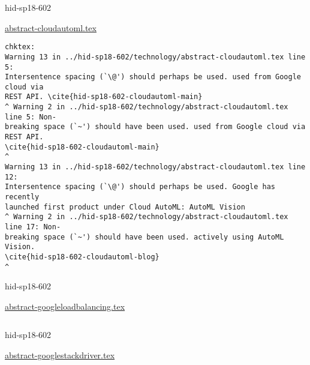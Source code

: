 

\begin{IU}

hid-sp18-602

\href{https://github.com/cloudmesh-community/hid-sp18-602/blob/master//technology/abstract-cloudautoml.tex}{abstract-cloudautoml.tex}

\begin{tiny}
\begin{verbatim}
chktex:
Warning 13 in ../hid-sp18-602/technology/abstract-cloudautoml.tex line 5:
Intersentence spacing (`\@') should perhaps be used. used from Google cloud via
REST API. \cite{hid-sp18-602-cloudautoml-main}
^ Warning 2 in ../hid-sp18-602/technology/abstract-cloudautoml.tex line 5: Non-
breaking space (`~') should have been used. used from Google cloud via REST API.
\cite{hid-sp18-602-cloudautoml-main}                                        ^
Warning 13 in ../hid-sp18-602/technology/abstract-cloudautoml.tex line 12:
Intersentence spacing (`\@') should perhaps be used. Google has recently
launched first product under Cloud AutoML: AutoML Vision
^ Warning 2 in ../hid-sp18-602/technology/abstract-cloudautoml.tex line 17: Non-
breaking space (`~') should have been used. actively using AutoML Vision.
\cite{hid-sp18-602-cloudautoml-blog}                                  ^
\end{verbatim}
\end{tiny}
\end{IU}



\begin{IU}

hid-sp18-602

\href{https://github.com/cloudmesh-community/hid-sp18-602/blob/master//technology/abstract-googleloadbalancing.tex}{abstract-googleloadbalancing.tex}

\begin{tiny}
\begin{verbatim}
\end{verbatim}
\end{tiny}
\end{IU}



\begin{IU}

hid-sp18-602

\href{https://github.com/cloudmesh-community/hid-sp18-602/blob/master//technology/abstract-googlestackdriver.tex}{abstract-googlestackdriver.tex}

\begin{tiny}
\begin{verbatim}
\end{verbatim}
\end{tiny}
\end{IU}

